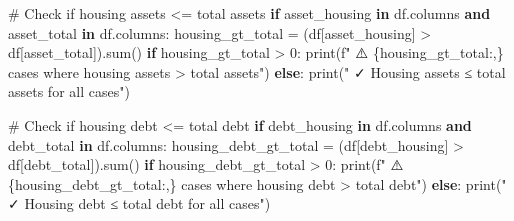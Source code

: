 \documentclass[
  letterpaper,
  DIV=11,
  numbers=noendperiod]{scrartcl}
\newenvironment{Shaded}{\begin{snugshade}}{\end{snugshade}}
\newcommand{\BuiltInTok}[1]{\textcolor[rgb]{0.00,0.23,0.31}{#1}}
\newcommand{\CommentTok}[1]{\textcolor[rgb]{0.37,0.37,0.37}{#1}}
\newcommand{\ControlFlowTok}[1]{\textcolor[rgb]{0.00,0.23,0.31}{\textbf{#1}}}
\newcommand{\DecValTok}[1]{\textcolor[rgb]{0.68,0.00,0.00}{#1}}
\newcommand{\KeywordTok}[1]{\textcolor[rgb]{0.00,0.23,0.31}{\textbf{#1}}}
\newcommand{\NormalTok}[1]{\textcolor[rgb]{0.00,0.23,0.31}{#1}}
\newcommand{\OperatorTok}[1]{\textcolor[rgb]{0.37,0.37,0.37}{#1}}
\newcommand{\SpecialCharTok}[1]{\textcolor[rgb]{0.37,0.37,0.37}{#1}}
\newcommand{\SpecialStringTok}[1]{\textcolor[rgb]{0.13,0.47,0.30}{#1}}
\newcommand{\StringTok}[1]{\textcolor[rgb]{0.13,0.47,0.30}{#1}}
\begin{document}
\begin{Shaded}
\begin{Highlighting}[]
\CommentTok{\# Check if housing assets \textless{}= total assets}
\ControlFlowTok{if} \StringTok{\textquotesingle{}asset\_housing\textquotesingle{}} \KeywordTok{in}\NormalTok{ df.columns }\KeywordTok{and} \StringTok{\textquotesingle{}asset\_total\textquotesingle{}} \KeywordTok{in}\NormalTok{ df.columns:}
\NormalTok{    housing\_gt\_total }\OperatorTok{=}\NormalTok{ (df[}\StringTok{\textquotesingle{}asset\_housing\textquotesingle{}}\NormalTok{] }\OperatorTok{\textgreater{}}\NormalTok{ df[}\StringTok{\textquotesingle{}asset\_total\textquotesingle{}}\NormalTok{]).}\BuiltInTok{sum}\NormalTok{()}
    \ControlFlowTok{if}\NormalTok{ housing\_gt\_total }\OperatorTok{\textgreater{}} \DecValTok{0}\NormalTok{:}
        \BuiltInTok{print}\NormalTok{(}\SpecialStringTok{f"   ⚠️ }\SpecialCharTok{\{}\NormalTok{housing\_gt\_total}\SpecialCharTok{:,\}}\SpecialStringTok{ cases where housing assets \textgreater{} total assets"}\NormalTok{)}
    \ControlFlowTok{else}\NormalTok{:}
        \BuiltInTok{print}\NormalTok{(}\StringTok{"   ✓ Housing assets ≤ total assets for all cases"}\NormalTok{)}

\CommentTok{\# Check if housing debt \textless{}= total debt}
\ControlFlowTok{if} \StringTok{\textquotesingle{}debt\_housing\textquotesingle{}} \KeywordTok{in}\NormalTok{ df.columns }\KeywordTok{and} \StringTok{\textquotesingle{}debt\_total\textquotesingle{}} \KeywordTok{in}\NormalTok{ df.columns:}
\NormalTok{    housing\_debt\_gt\_total }\OperatorTok{=}\NormalTok{ (df[}\StringTok{\textquotesingle{}debt\_housing\textquotesingle{}}\NormalTok{] }\OperatorTok{\textgreater{}}\NormalTok{ df[}\StringTok{\textquotesingle{}debt\_total\textquotesingle{}}\NormalTok{]).}\BuiltInTok{sum}\NormalTok{()}
    \ControlFlowTok{if}\NormalTok{ housing\_debt\_gt\_total }\OperatorTok{\textgreater{}} \DecValTok{0}\NormalTok{:}
        \BuiltInTok{print}\NormalTok{(}\SpecialStringTok{f"   ⚠️ }\SpecialCharTok{\{}\NormalTok{housing\_debt\_gt\_total}\SpecialCharTok{:,\}}\SpecialStringTok{ cases where housing debt \textgreater{} total debt"}\NormalTok{)}
    \ControlFlowTok{else}\NormalTok{:}
        \BuiltInTok{print}\NormalTok{(}\StringTok{"   ✓ Housing debt ≤ total debt for all cases"}\NormalTok{)}


\end{Highlighting}
\end{Shaded}
\end{document}
